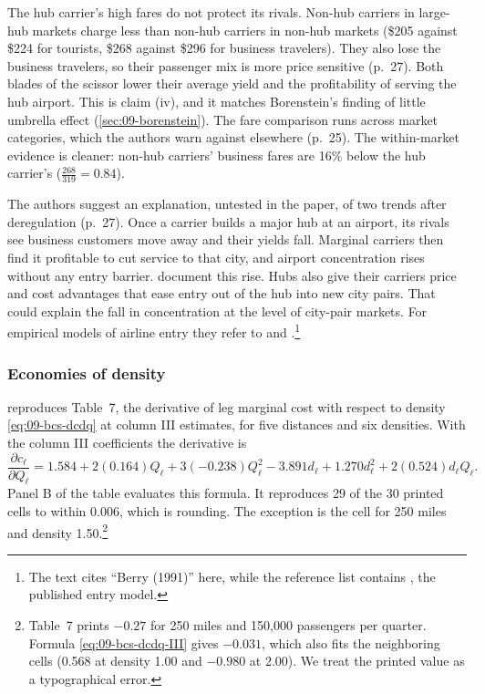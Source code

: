 The hub carrier's high fares do not protect its rivals. Non-hub carriers in large-hub markets charge less
than non-hub carriers in non-hub markets (\$205 against \$224 for tourists, \$268 against \$296 for business
travelers). They also lose the business travelers, so their passenger mix is more price sensitive (p.~27). Both
blades of the scissor lower their average yield and the profitability of serving the hub airport. This is
claim (iv), and it matches Borenstein's finding of little umbrella effect (\cref{sec:09-borenstein}). The
fare comparison runs across market categories, which the authors warn against elsewhere (p.~25). The
within-market evidence is cleaner: non-hub carriers' business fares are 16\% below the hub carrier's
($\frac{268}{319}=0.84$).

The authors suggest an explanation, untested in the paper, of two trends after deregulation (p.~27). Once a
carrier builds a major hub at an airport, its rivals see business customers move away and their yields fall.
Marginal carriers then find it profitable to cut service to that city, and airport concentration rises
without any entry barrier. \citet{BruecknerSpiller1994} document this rise. Hubs also give their carriers
price and cost advantages that ease entry out of the hub into new city pairs. That could explain the fall in
concentration at the level of city-pair markets. For empirical models of airline entry they refer to
\citet{ReissSpiller1989} and \citet{Berry1992}.\footnote{The text cites ``Berry (1991)'' here, while the
reference list contains \citet{Berry1992}, the published entry model.}

\subsubsection{Economies of density}

 reproduces Table~7, the derivative of leg marginal cost with respect to density
\eqref{eq:09-bcs-dcdq} at column III estimates, for five distances and six densities. With the column III
coefficients the derivative is
\begin{equation}\label{eq:09-bcs-dcdq-III}
\frac{\partial c_\ell}{\partial Q_\ell}=1.584+2(0.164)Q_\ell+3(-0.238)Q_\ell^2-3.891d_\ell+1.270d_\ell^2
+2(0.524)d_\ell Q_\ell .
\end{equation}
Panel B of the table evaluates this formula. It reproduces 29 of the 30 printed cells to within 0.006, which
is rounding. The exception is the cell for 250 miles and density 1.50.\footnote{Table~7 prints $-0.27$ for
250 miles and 150,000 passengers per quarter. Formula \eqref{eq:09-bcs-dcdq-III} gives $-0.031$, which also
fits the neighboring cells (0.568 at density 1.00 and $-0.980$ at 2.00). We treat the printed value as a
typographical error.}

